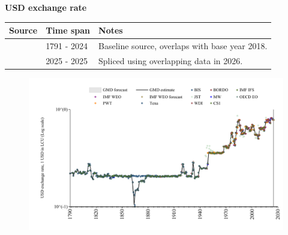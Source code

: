 \documentclass[12pt,a4paper,landscape]{article}
\begin{document}
\begin{adjustbox}{max totalsize={\paperwidth}{\paperheight},center}
\begin{minipage}[t][\textheight][t]{\textwidth}
\vspace*{0.5cm}
{}
\begin{center}
{\Large\bfseries USD exchange rate}
\end{center}
\vspace{0.5cm}
\begin{table}[H]
\centering
\small
\begin{tabular}{|l|l|l|}
\hline
\textbf{Source} & \textbf{Time span} & \textbf{Notes} \\
\hline
\rowcolor{white}\cite{BIS}& 1791 - 2024 &Baseline source, overlaps with base year 2018. \\
\rowcolor{lightgray}\cite{OECD_EO}& 2025 - 2025 &Spliced using overlapping data in 2026. \\
\hline
\end{tabular}
\end{table}
\begin{figure}[H]
\centering
\includegraphics[width=\textwidth,height=0.6\textheight,keepaspectratio]{graphs/GBR_USDfx.pdf}
\end{figure}
\end{minipage}
\end{adjustbox}
\end{document}
